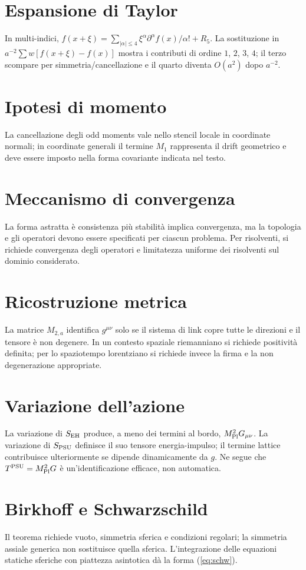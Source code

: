 \documentclass[11pt,a4paper]{article}
\begin{document}
\section{Espansione di Taylor}
In multi-indici, $f(x+\xi)=\sum_{|\alpha|\le4}\xi^\alpha\partial^\alpha f(x)/\alpha!+R_5$. La sostituzione in $a^{-2}\sum w[f(x+\xi)-f(x)]$ mostra i contributi di ordine $1$, $2$, $3$, $4$; il terzo scompare per simmetria/cancellazione e il quarto diventa $O(a^2)$ dopo $a^{-2}$.
\section{Ipotesi di momento}
La cancellazione degli odd moments vale nello stencil locale in coordinate normali; in coordinate generali il termine $M_1$ rappresenta il drift geometrico e deve essere imposto nella forma covariante indicata nel testo.
\section{Meccanismo di convergenza}
La forma astratta è consistenza più stabilità implica convergenza, ma la topologia e gli operatori devono essere specificati per ciascun problema. Per risolventi, si richiede convergenza degli operatori e limitatezza uniforme dei risolventi sul dominio considerato.
\section{Ricostruzione metrica}
La matrice $M_{2,a}$ identifica $g^{\mu\nu}$ solo se il sistema di link copre tutte le direzioni e il tensore è non degenere. In un contesto spaziale riemanniano si richiede positività definita; per lo spaziotempo lorentziano si richiede invece la firma e la non degenerazione appropriate.
\section{Variazione dell'azione}
La variazione di $S_{\rm EH}$ produce, a meno dei termini al bordo, $M_{\rm Pl}^2G_{\mu\nu}$. La variazione di $S_{\rm PSU}$ definisce il suo tensore energia-impulso; il termine lattice contribuisce ulteriormente se dipende dinamicamente da $g$. Ne segue che $T^{\rm PSU}=M_{\rm Pl}^2G$ è un'identificazione efficace, non automatica.
\section{Birkhoff e Schwarzschild}
Il teorema richiede vuoto, simmetria sferica e condizioni regolari; la simmetria assiale generica non sostituisce quella sferica. L'integrazione delle equazioni statiche sferiche con piattezza asintotica dà la forma (\ref{eq:schw}).
\end{document}
